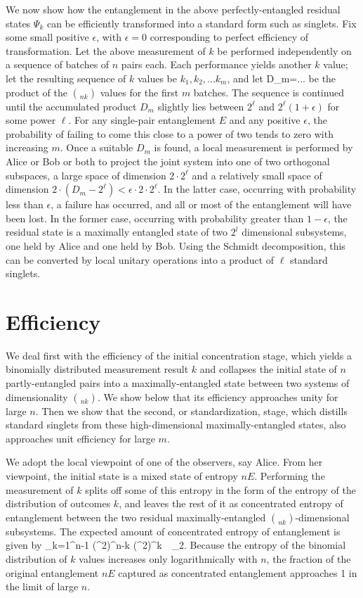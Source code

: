 We now show how the entanglement in the above perfectly-entangled
residual states $\Psi_k$ can be efficiently transformed into a standard
form such as singlets.  Fix some small positive $\epsilon$, with
$\epsilon=0$ corresponding to perfect efficiency of transformation. Let
the above measurement of $k$ be performed independently on a sequence of
batches of $n$ pairs each.  Each performance yields another $k$ value;
let the resulting sequence of $k$ values be $k_1, k_2, ...k_m$, and let
 \beq
D_m=...
 \eeq be the product of the $\choose {n}{k}$ values for the first $m$
batches.  The sequence is continued until the accumulated product $D_m$
slightly lies between $2^\ell$ and $2^\ell(1+\epsilon)$ for some power
$\ell$.  For any single-pair entanglement $E$ and any positive
$\epsilon$, the probability of failing to come this close to a power of
two tends to zero with increasing $m$.  Once a suitable $D_m$ is found,
a local measurement is performed by Alice or Bob or both to project the
joint system into one of two orthogonal subspaces, a large space of
dimension $2\cdot2^\ell$ and a relatively small space of dimension
$2\cdot(D_m-2^\ell)<\epsilon\cdot2\cdot2^\ell$.  In the latter case,
occurring with probability less than $\epsilon$, a failure has occurred,
and all or most of the entanglement will have been lost.  In the former
case, occurring with probability greater than $1-\epsilon$, the residual
state is a maximally entangled state of two $2^l$ dimensional
subsystems, one held by Alice and one held by Bob.  Using the Schmidt
decomposition, this can be converted by local unitary operations into a
product of $\ell$ standard singlets.
 
 
\section{Efficiency}
We deal first with the efficiency of the initial concentration
stage, which yields a binomially distributed measurement result
$k$ and collapses the initial state of $n$ partly-entangled pairs
into a maximally-entangled state between two systems of
dimensionality $\choose{n}{k}$.  We show below that its
efficiency approaches unity for large $n$.  Then we show that the
second, or standardization, stage, which distills standard
singlets from these high-dimensional maximally-entangled states,
also approaches unit efficiency for large $m$.
 
We adopt the local viewpoint of one of the observers, say Alice.
From her viewpoint, the initial state is a mixed state of entropy
$nE$.  Performing the measurement of $k$ splits off some of this
entropy in the form of the entropy of the distribution of
outcomes $k$, and leaves the rest of it as concentrated entropy
of entanglement between the two residual maximally-entangled
$\choose{n}{k}$-dimensional subsystems.  The expected amount of
concentrated entropy of entanglement is given by
\beq
\sum_{k=1}^{n-1} (\cos^2\theta)^{n-k} (\sin^2\theta)^k \,\,
 \log_2.
\eeq
Because the entropy of the binomial distribution of $k$ values
increases only logarithmically with $n$, the fraction of the
original entanglement $nE$ captured as concentrated
entanglement approaches 1 in the limit of large $n$.
 
